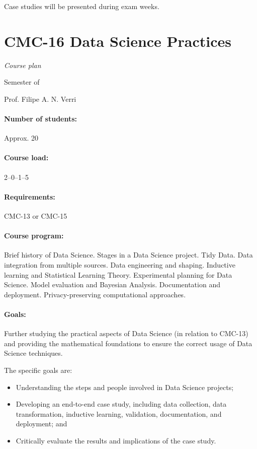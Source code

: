 Case studies will be presented during exam weeks.

\newpage
{}
\thispagestyle{empty}
\section*{CMC-16 Data Science Practices}

\emph{Course plan}

 Semester of \the\year{}

Prof. Filipe A. N. Verri

\paragraph{Number of students:} Approx. 20

\paragraph{Course load:} 2--0--1--5

\paragraph{Requirements:} CMC-13 or CMC-15

\paragraph{Course program:}
Brief history of Data Science. Stages in a Data Science project. Tidy Data. Data
integration from multiple sources. Data engineering and shaping. Inductive learning and
Statistical Learning Theory. Experimental planning for Data Science. Model evaluation and
Bayesian Analysis. Documentation and deployment. Privacy-preserving computational
approaches.

\paragraph{Goals:}
Further studying the practical aspects of Data Science (in relation to CMC-13) and providing
the mathematical foundations to ensure the correct usage of Data Science techniques.

The specific goals are:
\begin{itemize}
  \item Understanding the steps and people involved in Data Science projects;
  \item Developing an end-to-end case study, including data collection, data transformation,
    inductive learning, validation, documentation, and deployment; and
  \item Critically evaluate the results and implications of the case study.
\end{itemize}

